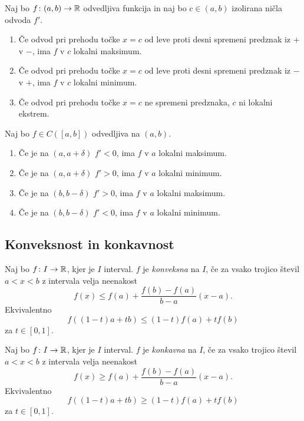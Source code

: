 \documentclass[12pt, a4paper]{article}
\begin{document}
\begin{posledica}
Naj bo $f\colon(a,b)\to\mathbb{R}$ odvedljiva funkcija in naj bo $c\in(a,b)$ izolirana ničla odvoda $f'$.

\begin{enumerate}[label=\roman*)]
\item Če odvod pri prehodu točke $x=c$ od leve proti desni spremeni predznak iz $+$ v $-$, ima $f$ v $c$ lokalni maksimum.
\item Če odvod pri prehodu točke $x=c$ od leve proti desni spremeni predznak iz $-$ v $+$, ima $f$ v $c$ lokalni minimum.
\item Če odvod pri prehodu točke $x=c$ ne spremeni predznaka, $c$ ni lokalni ekstrem.
\end{enumerate}
\end{posledica}

\begin{opomba}
Naj bo $f\in C\left([a,b]\right)$ odvedljiva na $(a,b)$.

\begin{enumerate}[label=\roman*)]
\item Če je na $(a,a+\delta)$ $f'<0$, ima $f$ v $a$ lokalni maksimum.
\item Če je na $(a,a+\delta)$ $f'>0$, ima $f$ v $a$ lokalni minimum.
\item Če je na $(b,b-\delta)$ $f'>0$, ima $f$ v $a$ lokalni maksimum.
\item Če je na $(b,b-\delta)$ $f'<0$, ima $f$ v $a$ lokalni minimum.
\end{enumerate}
\end{opomba}

\newpage

\subsection{Konveksnost in konkavnost}

\begin{definicija}
Naj bo $f\colon I\to\mathbb{R}$, kjer je $I$ interval. $f$ je \emph{konveksna} na $I$, če za vsako trojico števil $a<x<b$ z intervala velja neenakost
\[
f(x)\leq f(a)+\frac{f(b)-f(a)}{b-a}(x-a).
\]
Ekvivalentno
\[
f((1-t)a+tb)\leq (1-t)f(a)+tf(b)
\]
za $t\in[0,1]$.
\end{definicija}

\begin{definicija}
Naj bo $f\colon I\to\mathbb{R}$, kjer je $I$ interval. $f$ je \emph{konkavna} na $I$, če za vsako trojico števil $a<x<b$ z intervala velja neenakost
\[
f(x)\geq f(a)+\frac{f(b)-f(a)}{b-a}(x-a).
\]
Ekvivalentno
\[
f((1-t)a+tb)\geq (1-t)f(a)+tf(b)
\]
za $t\in[0,1]$.
\end{definicija}
\end{document}
